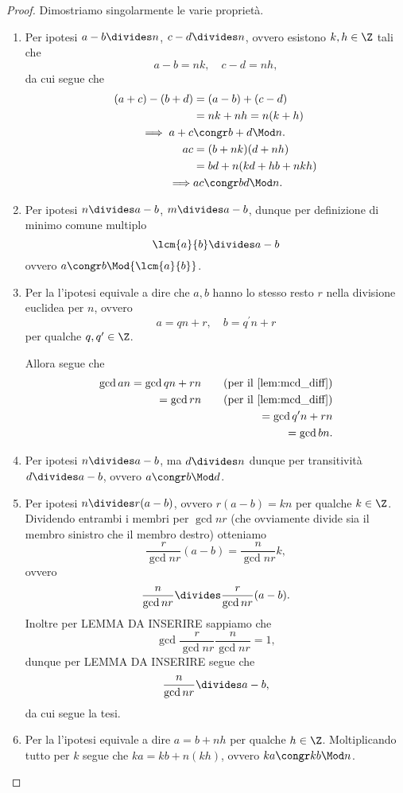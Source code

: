 \begin{proof}
    Dimostriamo singolarmente le varie proprietà.
    \begin{enumerate}[label={(\arabic*)}]
        \item Per ipotesi $a - b \divides n$, $c - d \divides n$, ovvero esistono $k, h \in \Z$ tali che \[
            a - b = nk, \quad c - d = nh,    
        \] da cui segue che 
        \begin{alignat*}{1}
            (a + c) - (b + d) &= (a - b) + (c - d) \\
            &= nk + nh = n(k+h) \\
            \implies a+c &\congr b+d \Mod n.\\
            ac &= (b + nk)(d +nh)\\
             &= bd + n(kd + hb + nkh) \\
            \implies &ac \congr bd \Mod n.
        \end{alignat*}
        \item Per ipotesi $n \divides a-b$, $m\divides a - b$, dunque per definizione di minimo comune multiplo \[
            \lcm{a}{b} \divides a - b    
        \] ovvero $a \congr b \Mod{\lcm{a}{b}}$.
        \item Per la  l'ipotesi equivale a dire che $a, b$ hanno lo stesso resto $r$ nella divisione euclidea per $n$, ovvero \[
            a = qn + r, \quad b = q^\prime n + r    
        \] per qualche $q, q^\prime \in \Z$.

        Allora segue che \begin{align*}
            \gcd{a}{n} = \gcd{qn + r}{n} \tag{per il \Cref{lem:mcd_diff}}\\
            = \gcd{r}{n} \tag{per il \Cref{lem:mcd_diff}}\\
            = \gcd{q^\prime n + r}{n}\\ 
            = \gcd{b}{n}.
        \end{align*}
        \item Per ipotesi $n \divides a - b$, ma $d \divides n$ dunque per transitività $d \divides a - b$, ovvero $a \congr b \Mod d$.
        \item Per ipotesi $n \divides r(a - b)$, ovvero $r(a-b) = kn$ per qualche $k \in \Z$. Dividendo entrambi i membri per $\gcd{n}{r}$ (che ovviamente divide sia il membro sinistro che il membro destro) otteniamo \[
            \frac{r}{\gcd{n}{r}}(a-b) = \frac{n}{\gcd{n}{r}}k,   
        \] ovvero \[
            \frac{n}{\gcd{n}{r}} \divides \frac{r}{\gcd{n}{r}}(a-b).
        \] Inoltre per LEMMA DA INSERIRE sappiamo che \[
            \gcd{\frac{r}{\gcd{n}{r}}}{\frac{n}{\gcd{n}{r}}} = 1,    
        \] dunque per LEMMA DA INSERIRE segue che \[
            \frac{n}{\gcd{n}{r}} \divides a - b,    
        \] da cui segue la tesi.
        \item Per la  l'ipotesi equivale a dire $a = b + nh$ per qualche $h \in \Z$. Moltiplicando tutto per $k$ segue che $ka = kb + n(kh)$, ovvero $ka \congr kb \Mod n$.
    \end{enumerate}
\end{proof}


